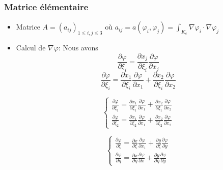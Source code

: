 \documentclass{beamer}
\begin{document}
\begin{frame}
\frametitle{Matrice élémentaire}
\begin{itemize}
\item Matrice $A=(a_{ij})_{1\leq i,j \leq 3}$ où $\displaystyle a_{ij} = a(\varphi_i,\varphi_j)=\displaystyle \int_{K_e}\nabla \varphi_i\cdot \nabla \varphi_j$
\item Calcul de $\nabla \varphi$: Nous avons
\[\frac{\partial \varphi}{\partial \xi_i}=\frac{\partial x_j}{\partial \xi_i}\frac{\partial \varphi}{\partial x_j}\]
\[\frac{\partial \varphi}{\partial \xi_i}=\frac{\partial x_1}{\partial \xi_i}\frac{\partial \varphi}{\partial x_1}+\frac{\partial x_2}{\partial \xi_i}\frac{\partial \varphi}{\partial x_2}\]

\[\left\{\begin{array}{l}
\displaystyle \frac{\partial \varphi}{\partial \xi_1}=\frac{\partial x_1}{\partial \xi_1}\frac{\partial \varphi}{\partial x_1}+\frac{\partial x_2}{\partial \xi_1}\frac{\partial \varphi}{\partial x_2}\\
\displaystyle \frac{\partial \varphi}{\partial \xi_2}=\frac{\partial x_1}{\partial \xi_2}\frac{\partial \varphi}{\partial x_1}+\frac{\partial x_2}{\partial \xi_2}\frac{\partial \varphi}{\partial x_2}
\end{array}\right.\]

\[\left\{\begin{array}{l}
\displaystyle \frac{\partial \varphi}{\partial \xi}=\frac{\partial x}{\partial \xi}\frac{\partial \varphi}{\partial x_1}+\frac{\partial y}{\partial \xi}\frac{\partial \varphi}{\partial y}\\
\displaystyle \frac{\partial \varphi}{\partial \eta}=\frac{\partial x}{\partial \eta}\frac{\partial \varphi}{\partial x}+\frac{\partial y}{\partial \eta}\frac{\partial \varphi}{\partial y}
\end{array}\right.\]
\end{itemize}
\end{frame}
\end{document}
